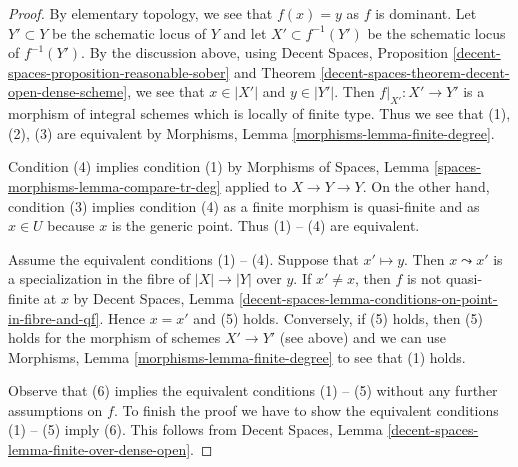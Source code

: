 \documentclass[10pt,a4paper]{amsart}
\theoremstyle{plain}
\theoremstyle{definition}
\theoremstyle{remark}
\numberwithin{equation}{subsection}
\begin{document}
\begin{proof}
By elementary topology, we see that $f(x) = y$ as $f$ is dominant.
Let $Y' \subset Y$ be the schematic locus of $Y$ and let
$X' \subset f^{-1}(Y')$ be the schematic locus of $f^{-1}(Y')$.
By the discussion above, using
Decent Spaces, Proposition \ref{decent-spaces-proposition-reasonable-sober} and
Theorem \ref{decent-spaces-theorem-decent-open-dense-scheme},
we see that $x \in |X'|$ and $y \in |Y'|$.
Then $f|_{X'} : X' \to Y'$ is a morphism of integral schemes
which is locally of finite type. Thus we see that (1), (2), (3)
are equivalent by Morphisms, Lemma \ref{morphisms-lemma-finite-degree}.

\medskip\noindent
Condition (4) implies condition (1) by
Morphisms of Spaces, Lemma \ref{spaces-morphisms-lemma-compare-tr-deg}
applied to $X \to Y \to Y$.
On the other hand, condition (3) implies condition (4) as
a finite morphism is quasi-finite and as $x \in U$ because $x$
is the generic point. Thus (1) -- (4) are equivalent.

\medskip\noindent
Assume the equivalent conditions (1) -- (4). Suppose that
$x' \mapsto y$. Then $x \leadsto x'$ is a specialization in the
fibre of $|X| \to |Y|$ over $y$. If $x' \not = x$, then $f$ is not
quasi-finite at $x$ by Decent Spaces, Lemma
\ref{decent-spaces-lemma-conditions-on-point-in-fibre-and-qf}.
Hence $x = x'$ and (5) holds. Conversely, if (5) holds, then
(5) holds for the morphism of schemes $X' \to Y'$ (see above)
and we can use
Morphisms, Lemma \ref{morphisms-lemma-finite-degree}
to see that (1) holds.

\medskip\noindent
Observe that (6) implies the equivalent conditions (1) -- (5)
without any further assumptions on $f$. To finish the proof
we have to show the equivalent conditions (1) -- (5) imply (6).
This follows from Decent Spaces, Lemma
\ref{decent-spaces-lemma-finite-over-dense-open}.
\end{proof}
\end{document}
